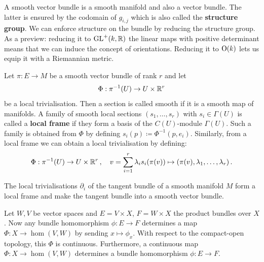 \begin{corollary}
A smooth vector bundle is a smooth manifold and also a vector bundle. The latter is ensured by the codomain of $g_{i,j}$ which is also called the \textbf{structure group}. We can enforce structure on the bundle by reducing the structure group. As a preview: reducing it to $\mathrm{GL}^+(k,\mathbb{R})$ the linear maps with positive determinant means that we can induce the concept of orientations. Reducing it to $\operatorname{\mathrm{O}}(k)$ lets us equip it with a Riemannian metric. 
\end{corollary}

\begin{definition}\label{def:vb-framesFromTrivialisations}
Let $\pi:E\to M$ be a smooth vector bundle of rank $r$ and let 
\begin{equation*}
	\Phi: \pi^{-1}(U) \to U\times \mathbb{R}^r
\end{equation*} be a local trivialisation.
Then a section is called smooth if it is a smooth map of manifolds. A family of smooth local sections $(s_1,\dots, s_r)$ with $s_i\in \Gamma(U)$ is called a \textbf{local frame} if they form a basis of the $C(U)$-module $\Gamma(U)$. Such a family is obtained from $\Phi$ by defining $s_i(p)\coloneq \Phi^{-1}(p,e_i)$. Similarly, from a local frame we can obtain a local trivialisation by defining:
\begin{equation*}
	\Phi: \pi^{-1}(U) \to U\times \mathbb{R}^r\,,\quad v=\sum_{i=1}^{r} \lambda_i s_i(\pi(v)) \mapsto (\pi(v),\lambda_1,\dots, \lambda_r)\,.
\end{equation*}
\end{definition}
\begin{example}
The local trivialisations $\partial_i$ of the tangent bundle of a smooth manifold $M$ form a local frame and make the tangent bundle into a smooth vector bundle.
\end{example}




\begin{definition}\label{def:vb-homomorphismBundle}
	Let $W,V$ be vector spaces and $E=V\times X$, $F=W\times X$ the product bundles over $X$. Now any bundle homomorphism $\phi:E\to F$ determines a map $\Phi:X\to \hom(V, W)$ by sending $x\mapsto \phi_x$. With respect to the compact-open topology, this $\Phi$ is continuous. Furthermore, a continuous map $\Phi:X \to \hom(V,W)$ determines a bundle homomorphism $\phi:E\to F$.
\end{definition}

